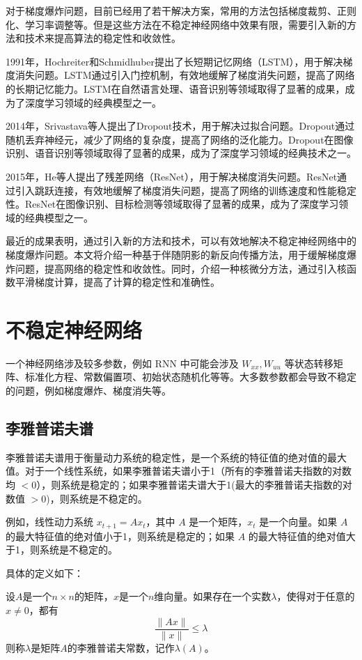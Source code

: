 \documentclass[12pt,a4paper]{amsart}
\begin{document}
对于梯度爆炸问题，目前已经用了若干解决方案，常用的方法包括梯度裁剪、正则化、学习率调整等。但是这些方法在不稳定神经网络中效果有限，需要引入新的方法和技术来提高算法的稳定性和收敛性。

1991年，Hochreiter和Schmidhuber提出了长短期记忆网络（LSTM），用于解决梯度消失问题。LSTM通过引入门控机制，有效地缓解了梯度消失问题，提高了网络的长期记忆能力。LSTM在自然语言处理、语音识别等领域取得了显著的成果，成为了深度学习领域的经典模型之一。

2014年，Srivastava等人提出了Dropout技术，用于解决过拟合问题。Dropout通过随机丢弃神经元，减少了网络的复杂度，提高了网络的泛化能力。Dropout在图像识别、语音识别等领域取得了显著的成果，成为了深度学习领域的经典技术之一。

2015年，He等人提出了残差网络（ResNet），用于解决梯度消失问题。ResNet通过引入跳跃连接，有效地缓解了梯度消失问题，提高了网络的训练速度和性能稳定性。ResNet在图像识别、目标检测等领域取得了显著的成果，成为了深度学习领域的经典模型之一。

最近的成果表明，通过引入新的方法和技术，可以有效地解决不稳定神经网络中的梯度爆炸问题。本文将介绍一种基于伴随阴影的新反向传播方法，用于缓解梯度爆炸问题，提高网络的稳定性和收敛性。同时，介绍一种核微分方法，通过引入核函数平滑梯度计算，提高了计算的稳定性和准确性。

\section{不稳定神经网络}

一个神经网络涉及较多参数，例如 RNN 中可能会涉及 $W_{xx}, W_{uu}$ 等状态转移矩阵、标准化方程、常数偏置项、初始状态随机化等等。大多数参数都会导致不稳定的问题，例如梯度爆炸、梯度消失等。

\subsection{李雅普诺夫谱}

李雅普诺夫谱用于衡量动力系统的稳定性，是一个系统的特征值的绝对值的最大值。对于一个线性系统，如果李雅普诺夫谱小于1（所有的李雅普诺夫指数的对数均 $<0$），则系统是稳定的；如果李雅普诺夫谱大于1(最大的李雅普诺夫指数的对数值 $>0$)，则系统是不稳定的。

例如，线性动力系统 $x_{t+1} = A x_t$，其中 $A$ 是一个矩阵，$x_t$ 是一个向量。如果 $A$ 的最大特征值的绝对值小于1，则系统是稳定的；如果 $A$ 的最大特征值的绝对值大于1，则系统是不稳定的。

具体的定义如下：

\begin{definition}[李雅普诺夫常数]
设$A$是一个$n\times n$的矩阵，$x$是一个$n$维向量。如果存在一个实数$\lambda$，使得对于任意的$x\neq 0$，都有
\[
\frac{\|Ax\|}{\|x\|}\leq \lambda
\]
则称$\lambda$是矩阵$A$的李雅普诺夫常数，记作$\lambda(A)$。
\end{definition}
\end{document}
